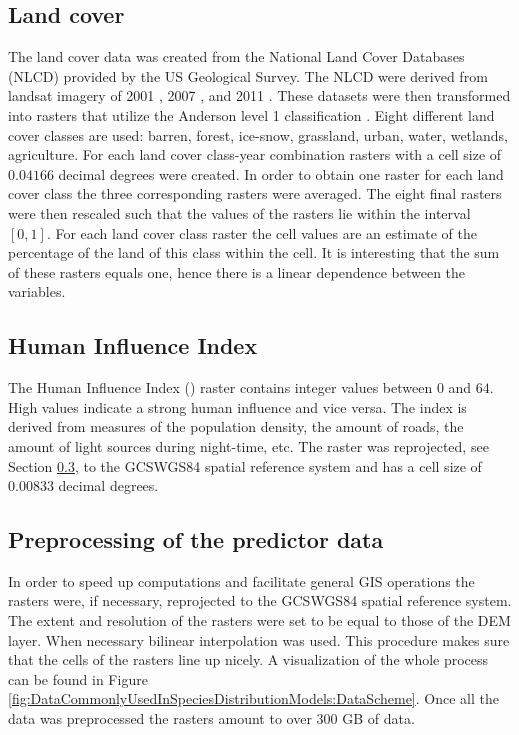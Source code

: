 \subsection{Land cover}
The land cover data was created from the National Land Cover Databases (NLCD) provided by the US Geological Survey. The NLCD were derived from landsat imagery of 2001 \parencite{vogelmann2001completion}, 2007 \parencite{homer2007completion}, and 2011 \parencite{fry2011completion}. These datasets were then transformed into rasters that utilize the Anderson level 1 classification \parencite{anderson_land_1976}. Eight different land cover classes are used: barren, forest, ice-snow, grassland, urban, water, wetlands, agriculture. For each land cover class-year combination rasters with a cell size of $0.04166$ decimal degrees were created. In order to obtain one raster for each land cover class the three corresponding rasters were averaged. The eight final rasters were then rescaled such that the values of the rasters lie within the interval $[0,1]$. For each land cover class raster the cell values are an estimate of the percentage of the land of this class within the cell. It is interesting that the sum of these rasters equals one, hence there is a linear dependence between the variables.

\subsection{Human Influence Index}
The Human Influence Index (\citeauthor{hii}) raster contains integer values between $0$ and $64$. High values indicate a strong human influence and vice versa. The index is derived from measures of the population density, the amount of roads, the amount of light sources during night-time, etc. The raster was reprojected, see Section \ref{sec:preprocessing}, to the GCS\textunderscore WGS84 spatial reference system and has a cell size of $0.00833$ decimal degrees.

\subsection{Preprocessing of the predictor data}
\label{sec:preprocessing}
In order to speed up computations and facilitate general GIS operations the rasters were, if necessary, reprojected to the GCS\textunderscore WGS84 spatial reference system. The extent and resolution of the rasters were set to be equal to those of the DEM layer. When necessary bilinear interpolation was used. This procedure makes sure that the cells of the rasters line up nicely. A visualization of the whole process can be found in Figure \ref{fig:DataCommonlyUsedInSpeciesDistributionModels:DataScheme}. Once all the data was preprocessed the rasters amount to over $300$ GB of data.

